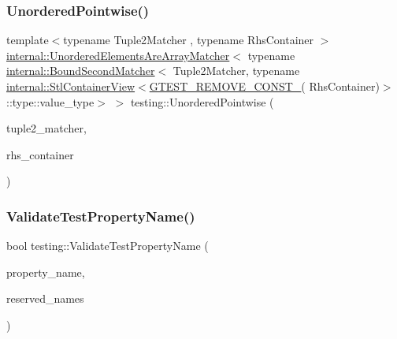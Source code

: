 \subsubsection{\texorpdfstring{Unordered\+Pointwise()}{UnorderedPointwise()}}
{\footnotesize\ttfamily template$<$typename Tuple2\+Matcher , typename Rhs\+Container $>$ \\
\hyperlink{classtesting_1_1internal_1_1_unordered_elements_are_array_matcher}{internal\+::\+Unordered\+Elements\+Are\+Array\+Matcher}$<$ typename \hyperlink{classtesting_1_1internal_1_1_bound_second_matcher}{internal\+::\+Bound\+Second\+Matcher}$<$ Tuple2\+Matcher, typename \hyperlink{classtesting_1_1internal_1_1_stl_container_view}{internal\+::\+Stl\+Container\+View}$<$\hyperlink{gtest-internal_8h_a2ffec8c60510eb130af387f5ce9a756a}{G\+T\+E\+S\+T\+\_\+\+R\+E\+M\+O\+V\+E\+\_\+\+C\+O\+N\+S\+T\+\_\+}( Rhs\+Container)$>$\+::type\+::value\+\_\+type$>$ $>$ testing\+::\+Unordered\+Pointwise (\begin{DoxyParamCaption}\item[{const Tuple2\+Matcher \&}]{tuple2\+\_\+matcher,  }\item[{const Rhs\+Container \&}]{rhs\+\_\+container }\end{DoxyParamCaption})\hspace{0.3cm}{\ttfamily [inline]}}

\mbox{\label{namespacetesting_a4c9bd414747bf0563bfdb32a2307dcdf}} 
\subsubsection{\texorpdfstring{Validate\+Test\+Property\+Name()}{ValidateTestPropertyName()}}
{\footnotesize\ttfamily bool testing\+::\+Validate\+Test\+Property\+Name (\begin{DoxyParamCaption}\item[{const std\+::string \&}]{property\+\_\+name,  }\item[{const std\+::vector$<$ std\+::string $>$ \&}]{reserved\+\_\+names }\end{DoxyParamCaption})}

\mbox{\label{namespacetesting_ae44c50a3a7f0a46f05c8a0b0592b4a62}} 
